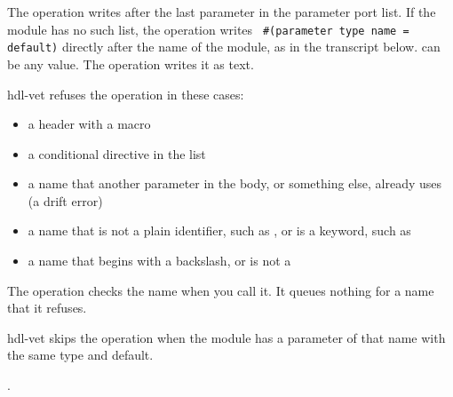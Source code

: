 \begin{entry}{}
\item[Writes] The operation writes  after the last
  parameter in the parameter port list. If the module has no such list, the operation
  writes \texttt{ \#(parameter type name = default)} directly after the name of the
  module, as in the transcript below.  can be any value. The operation
  writes it as text.
\item[Refused] hdl-vet refuses the operation in these cases:
  \begin{itemize}
  \item a header with a macro
  \item a conditional directive in the list
  \item a name that another parameter in the body, or something else, already uses (a
    drift error)
  \item a name that is not a plain identifier, such as , or is a keyword,
    such as 
  \item a name that begins with a backslash, or is not a 
  \end{itemize}
  The operation checks the name when you call it. It queues nothing for a name that it
  refuses.
\item[Again] hdl-vet skips the operation when the module has a parameter of that name with
  the same type and default.
\item[Example] .
\end{entry}

